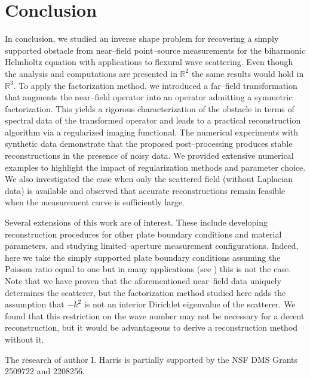 \documentclass{article}
\newcommand{\R}{\mathbb{R}}
\numberwithin{equation}{section}
\begin{document}
{%
\section{Conclusion}\label{conclusion}
In conclusion, we studied an inverse shape problem for recovering a simply supported obstacle from near--field point--source measurements for the biharmonic Helmholtz equation with applications to flexural wave scattering. Even though the analysis and computations are presented in $\R^2$ the same results would hold in $\R^3$. To apply the factorization method, we introduced a far--field transformation that augments the near--field operator into an operator admitting a symmetric factorization. This yields a rigorous characterization of the obstacle in terms of spectral data of the transformed operator and leads to a practical reconstruction algorithm via a regularized imaging functional. The numerical experiments with synthetic data demonstrate that the proposed post--processing produces stable reconstructions in the presence of noisy data. We provided extensive numerical examples to highlight the impact of regularization methods and parameter choice. We also investigated the case when only the scattered field (without Laplacian data) is available and observed that accurate reconstructions remain feasible when the measurement curve is sufficiently large.

Several extensions of this work are of interest. These include developing reconstruction procedures for other plate boundary conditions and material parameters, and studying limited--aperture measurement configurations. Indeed, here we take the simply supported plate boundary conditions assuming the Poisson ratio equal to one but in many applications (see \cite{ffdata-simpsupport}) this is not the case. Note that we have proven that the aforementioned near--field data uniquely determines the scatterer, but the factorization method studied here adds the assumption that $-k^2$ is not an interior Dirichlet eigenvalue of the scatterer. We found that this restriction on the wave number may not be necessary for a decent reconstruction, but it would be advantageous to derive a reconstruction method without it.   


\vspace{0.2in}

 The research of author I. Harris is partially supported by the NSF DMS Grants 2509722 and 2208256. 


}
\end{document}
